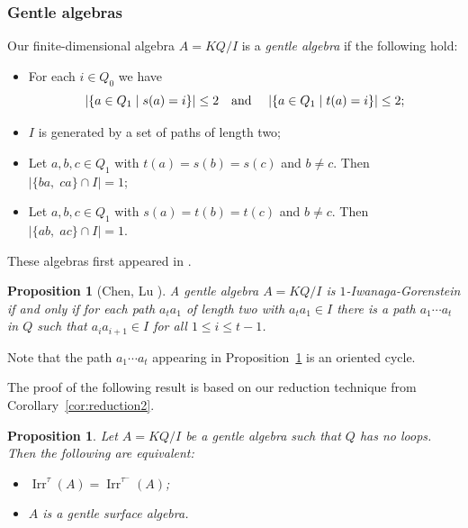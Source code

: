 \documentclass[12pt,reqno]{amsart}
\newtheorem{Prop}[Thm]{Proposition}
\theoremstyle{definition}
\newcommand{\irr}{\operatorname{Irr}}
\begin{document}
\subsubsection{Gentle algebras}
Our finite-dimensional algebra $A = KQ/I$ is a
\emph{gentle algebra} if the following
hold:
\begin{itemize}\itemsep2mm

\item[(i)]
For each $i \in Q_0$ we have
$$
|\{ a \in Q_1 \mid s(a) = i \}| \le 2
\text{\quad and \quad}
|\{ a \in Q_1 \mid t(a) = i \}| \le 2;
$$

\item[(ii)]
$I$ is generated by a set of paths of length two;

\item[(iii)]
Let $a,b,c \in Q_1$ with $t(a) = s(b) = s(c)$ and $b \not= c$.
Then $|\{ ba,\; ca \} \cap I| = 1$;

\item[(iv)]
Let $a,b,c \in Q_1$ with $s(a) = t(b) = t(c)$ and $b \not= c$.
Then $|\{ ab,\; ac \} \cap I| = 1$.

\end{itemize}

These algebras first appeared in \cite{AS87}.


\begin{Prop}[{Chen, Lu \cite[Proposition~3.1]{CL16}}] \label{prop:CL}
A gentle algebra $A = KQ/I$ is $1$-Iwanaga-Gorenstein
if and only if for each path $a_ta_1$ of length two with
$a_ta_1 \in I$ there is a
path $a_1 \cdots a_t$ in $Q$ such that
$a_ia_{i+1} \in I$ for all $1 \le i \le t-1$.
\end{Prop}

Note that the path $a_1 \cdots a_t$ appearing in
Proposition~\ref{prop:CL} is an oriented cycle.

The proof of the following result is based on our reduction technique
from Corollary~\ref{cor:reduction2}.

\begin{Prop}\label{prop:gentle}
Let $A = KQ/I$ be a gentle algebra such that $Q$ has no loops.
Then the following are equivalent:
\begin{itemize}\itemsep2mm

\item[(i)]
$\irr^\tau(A) = \irr^{\tau^-}(A)$;

\item[(ii)]
$A$ is a gentle surface algebra.

\end{itemize}
\end{Prop}
\end{document}
